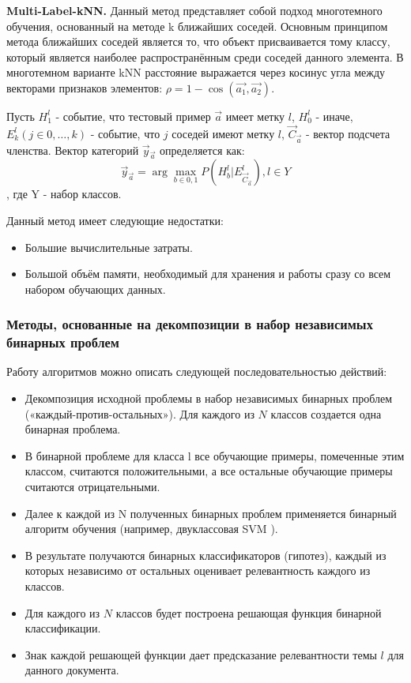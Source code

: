 \documentclass[russian, utf8, emptystyle]{eskdtext}
\begin{document}
{\bf Multi-Label-kNN.} Данный метод представляет собой подход многотемного обучения, основанный на методе k ближайших соседей.
Основным принципом метода ближайших соседей является то, что объект присваивается тому классу, который является наиболее распространённым среди соседей данного элемента.
В многотемном варианте kNN расстояние выражается через косинус угла между векторами признаков элементов: $\rho = 1 - \cos(\vec{a_1}, \vec{a_2})$.


Пусть $H^l_{1}$ - событие, что тестовый пример $\vec{a}$ имеет метку $l$,  $H^l_{0}$ - иначе, $E^l_k(j \in {0,\ldots,k})$ - событие, что $j$ соседей имеют метку $l$, ${\vec{C}_{\vec{a}}}$ - вектор подсчета членства. Вектор категорий ${\vec{y}_{\vec{a}}}$ определяется как: 
$${\vec{y}_{\vec{a}}} = \arg \max_{b \in {0,1}}P(H^l_b|E^l_{{\vec{C}_{\vec{a}}}}), l \in Y$$, где Y - набор классов.

Данный метод имеет следующие недостатки:
\begin{itemize}
	\item Большие вычислительные затраты.
	\item Большой объём памяти, необходимый для хранения и работы сразу со всем набором обучающих данных.
\end{itemize}
\subsubsection{Методы, основанные на декомпозиции в набор независимых бинарных проблем}
Работу алгоритмов можно описать следующей последовательностью действий:
\begin{itemize}
	\item Декомпозиция исходной проблемы  в набор независимых бинарных проблем («каждый-против-остальных»). Для каждого из $N$ классов создается одна бинарная проблема.
	\item В бинарной проблеме для класса l  все обучающие примеры, помеченные этим классом, считаются положительными, а все остальные обучающие примеры считаются отрицательными.
	\item Далее к каждой из N полученных бинарных проблем применяется бинарный алгоритм обучения (например, двуклассовая SVM \cite{SVM}).
	\item В результате получаются   бинарных классификаторов (гипотез), каждый из которых независимо от остальных оценивает релевантность каждого из   классов.
	\item Для каждого из $N$ классов будет построена решающая функция  бинарной классификации.
	\item Знак каждой решающей функции дает предсказание релевантности темы $l$ для данного документа.
\end{itemize}
	
\end{document}
